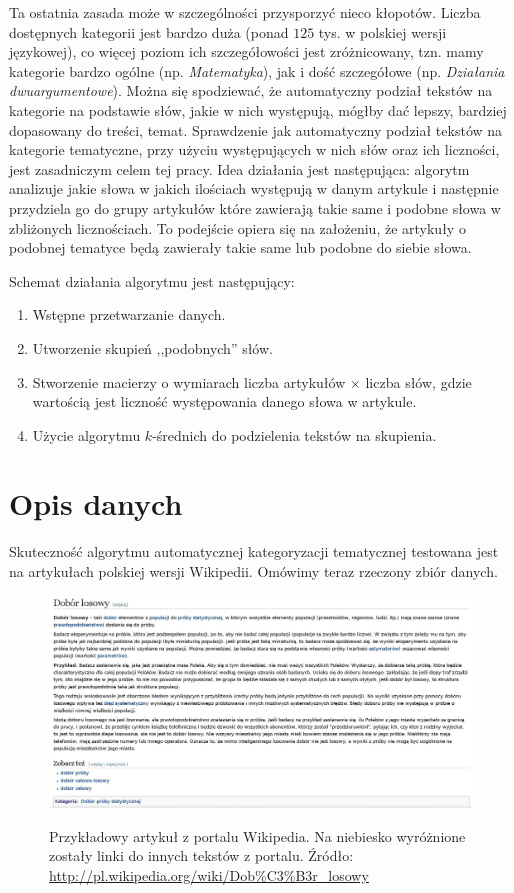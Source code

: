 \documentclass{praca1}
\begin{document}
Ta ostatnia zasada może w szczególności przysporzyć nieco kłopotów. Liczba dostępnych kategorii jest bardzo duża (ponad $125$ tys. w polskiej wersji językowej), co więcej poziom ich szczegółowości jest zróżnicowany, tzn. mamy kategorie bardzo ogólne (np. \emph{Matematyka}), jak i dość szczegółowe (np. \emph{Działania dwuargumentowe}). Można się spodziewać, że automatyczny podział tekstów na kategorie na podstawie słów, jakie w nich występują, mógłby dać lepszy, bardziej dopasowany do treści, temat. Sprawdzenie jak automatyczny podział tekstów na kategorie tematyczne, przy użyciu występujących w nich słów oraz ich liczności, jest zasadniczym celem tej pracy. Idea działania jest następująca: algorytm analizuje jakie słowa w jakich ilościach występują w danym artykule i następnie przydziela go do grupy artykułów które zawierają takie same i podobne słowa w zbliżonych licznościach. To podejście opiera się na założeniu, że artykuły o podobnej tematyce będą zawierały takie same lub podobne do siebie słowa. 

Schemat działania algorytmu jest następujący:
\begin{enumerate}
\item Wstępne przetwarzanie danych.
\item Utworzenie skupień ,,podobnych'' słów.
\item Stworzenie macierzy o wymiarach liczba artykułów $\times$ liczba słów, gdzie wartością jest liczność występowania danego słowa w artykule.
\item Użycie algorytmu $k$-średnich do podzielenia tekstów na skupienia.
\end{enumerate}

\section{Opis danych}

Skuteczność algorytmu automatycznej kategoryzacji tematycznej testowana jest na artykułach polskiej wersji Wikipedii. Omówimy teraz rzeczony zbiór danych.

\begin{figure}[!h]
  \centering
  \includegraphics[width=450pt]{wiki2.jpg}\\
  \caption{Przykładowy artykuł z portalu Wikipedia. Na niebiesko wyróżnione zostały linki do innych tekstów z portalu. Źródło: \url{http://pl.wikipedia.org/wiki/Dob\%C3\%B3r\_losowy}}\label{wiki}
\end{figure}
\end{document}
